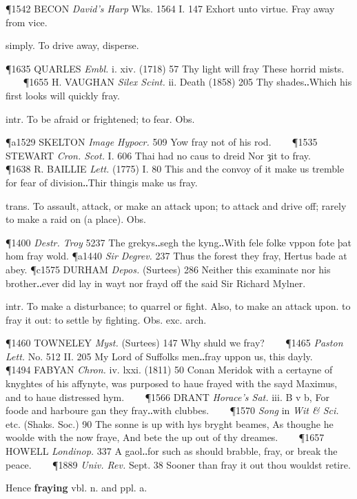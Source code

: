 \begin{description}[wide, labelwidth=!, labelindent=0pt]
\begin{myenumerate}
\P 1542 BECON  \textit{David's Harp} Wks. 1564 I. 147  Exhort unto virtue. Fray away from vice.

 simply. To drive away, disperse.

\P 1635 QUARLES  \textit{Embl.} i. xiv. (1718) 57 Thy light will fray These horrid mists.    
\P 1655 H. VAUGHAN  \textit{Silex Scint.} ii. Death (1858) 205 Thy shades‥Which his first looks will quickly fray.

 intr. To be afraid or frightened; to fear. Obs.

\P a1529 SKELTON  \textit{Image Hypocr.} 509 Yow fray not of his rod.    
\P 1535 STEWART  \textit{Cron. Scot.} I. 606 Thai had no caus to dreid Nor ȝit to fray.    
\P 1638 R. BAILLIE  \textit{Lett.} (1775) I. 80 This and the convoy of it make us tremble for fear of division‥Thir thingis make us fray.

 trans. To assault, attack, or make an attack upon; to attack and drive off; rarely to make a raid on (a place). Obs.

\P 1400  \textit{Destr. Troy} 5237 The grekys‥segh the kyng‥With fele folke vppon fote þat hom fray wold.
\P a1440 \textit{Sir Degrev.}  237 Thus the forest they fray, Hertus bade at abey.
\P c1575 DURHAM  \textit{Depos.} (Surtees) 286 Neither this examinate nor his brother‥ever did lay in wayt nor frayd off the said Sir Richard Mylner.

 intr. To make a disturbance; to quarrel or fight. Also, to make an attack upon. to fray it out: to settle by fighting. Obs. exc. arch.

\P 1460 TOWNELEY  \textit{Myst.} (Surtees) 147 Why shuld we fray?    
\P 1465 \textit{Paston  Lett.} No. 512 II. 205 My Lord of Suffolks men‥fray uppon us, this dayly.    
\P 1494 FABYAN \textit{Chron.} iv. lxxi. (1811) 50 Conan Meridok with a certayne of knyghtes of his affynyte, was purposed to haue frayed with the sayd Maximus, and to haue distressed hym.    
\P 1566 DRANT  \textit{Horace's Sat.} iii. B v b, For foode and harboure gan they fray‥with clubbes.    
\P 1570 \textit{Song} in  \textit{Wit \& Sci.} etc. (Shaks. Soc.) 90 The sonne is up with hys bryght beames, As thoughe he woolde with the now fraye, And bete the up out of thy dreames.    
\P 1657 HOWELL  \textit{Londinop.} 337 A gaol‥for such as should brabble, fray, or break the peace.    
\P 1889  \textit{Univ. Rev.} Sept. 38 Sooner than fray it out thou wouldst retire.

\noindent Hence \textbf{fraying} vbl. n. and ppl. a.


\end{myenumerate}
\end{description}
